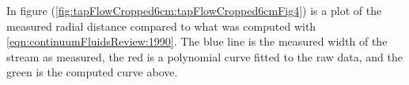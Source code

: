\begin{Answer}[ref={problem:fluids:review:q2}]
In figure (\ref{fig:tapFlowCropped6cm:tapFlowCropped6cmFig4}) is a plot of the measured radial distance compared to what was computed with \ref{eqn:continuumFluidsReview:1990}.  The blue line is the measured width of the stream as measured, the red is a polynomial curve fitted to the raw data, and the green is the computed curve above.

\end{Answer}
